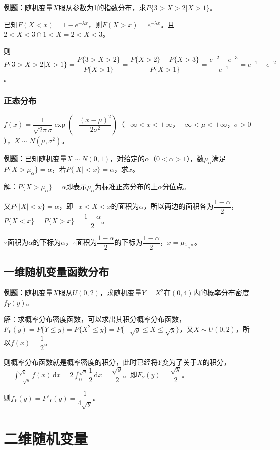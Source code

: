 \documentclass[UTF8, 12pt]{ctexart}
\begin{document}
\textbf{例题：}随机变量$X$服从参数为1的指数分布，求$P\{3>X>2|X>1\}$。

已知$F(X<x)=1-e^{-\lambda x}$，则$F(X>x)=e^{-\lambda x}$。且$2<X<3\cap 1<X=2<X<3$。

则$P\{3>X>2|X>1\}=\dfrac{P\{3>X>2\}}{P\{X>1\}}=\dfrac{P\{X>2\}-P\{X>3\}}{P\{X>1\}}=\dfrac{e^{-2}-e^{-3}}{e^{-1}}=e^{-1}-e^{-2}$。

\subsubsection{正态分布}

$f(x)=\dfrac{1}{\sqrt{2\pi}\sigma}\exp\left(-\dfrac{(x-\mu)^2}{2\sigma^2}\right)$（$-\infty<x<+\infty$，$-\infty<\mu<+\infty$，$\sigma>0$），$X\sim N(\mu,\sigma^2)$。

\textbf{例题：}已知随机变量$X\sim N(0,1)$，对给定的$\alpha$（$0<\alpha>1$），数$\mu_\alpha$满足$P\{X>\mu_\alpha\}=\alpha$，若$P\{\vert X\vert<x\}=\alpha$，求$x$。

解：$P\{X>\mu_\alpha\}=\alpha$即表示$\mu_\alpha$为标准正态分布的上$\alpha$分位点。

又$P\{\vert X\vert<x\}=\alpha$，即$-x<X<x$的面积为$\alpha$，所以两边的面积各为$\dfrac{1-\alpha}{2}$，$P\{X<x\}=P\{X>x\}=\dfrac{1-\alpha}{2}$。

$\because$面积为$\alpha$的下标为$\alpha$，$\therefore$面积为$\dfrac{1-\alpha}{2}$的下标为$\dfrac{1-\alpha}{2}$，$x=\mu_\frac{1-\alpha}{2}$。

\subsection{一维随机变量函数分布}

\textbf{例题：}随机变量$X$服从$U(0,2)$，求随机变量$Y=X^2$在$(0,4)$内的概率分布密度$f_Y(y)$。

解：求概率分布密度函数，可以求出其积分概率分布函数，$F_Y(y)=P\{Y\leqslant y\}=P\{X^2\leqslant y\}=P\{-\sqrt{y}\leqslant X\leqslant\sqrt{y}\}$，又$X\sim U(0,2)$，所以$f(x)=\dfrac{1}{2}$。

则概率分布函数就是概率密度的积分，此时已经将$Y$变为了关于$X$的积分，$=\int_{-\sqrt{y}}^{\sqrt{y}}f(x)\,\textrm{d}x=$$\displaystyle{2\int_0^{\sqrt{y}}\dfrac{1}{2}\,\textrm{d}x}=\dfrac{\sqrt{y}}{2}$。即$F_Y(y)=\dfrac{\sqrt{y}}{2}$。

则$f_Y(y)=F'_Y(y)=\dfrac{1}{4\sqrt{y}}$。

\section{二维随机变量}
\end{document}
